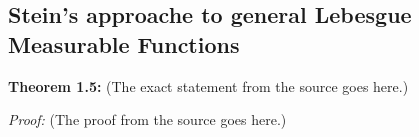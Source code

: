 \subsection{Stein's approache to general Lebesgue Measurable Functions}
\label{cite_def:stein_l_f}

\textbf{Theorem 1.5:} (The exact statement from the source goes here.)

\textit{Proof:} (The proof from the source goes here.)